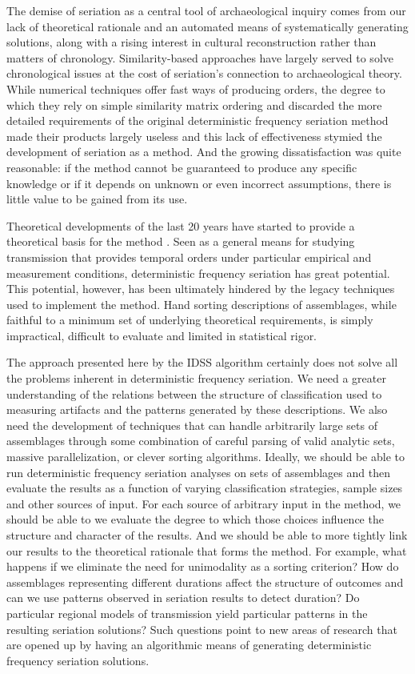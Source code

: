 \documentclass[10pt,letterpaper]{article}
\begin{document}
The demise of seriation as a central tool of archaeological inquiry comes from our lack of theoretical rationale and an automated means of systematically generating solutions, along with a rising interest in cultural reconstruction rather than matters of chronology. Similarity-based approaches have largely served to solve chronological issues at the cost of seriation’s connection to archaeological theory. While numerical techniques offer fast ways of producing orders, the degree to which they rely on simple similarity matrix ordering and discarded the more detailed requirements of the original deterministic frequency seriation method made their products largely useless and this lack of effectiveness stymied the development of seriation as a method. And the growing dissatisfaction was quite reasonable: if the method cannot be guaranteed to produce any specific knowledge or if it depends on unknown or even incorrect assumptions, there is little value to be gained from its use. 

Theoretical developments of the last 20 years have started to provide a theoretical basis for the method \cite{Dunnell1978,Lipo1997Population,Lipo2001,Lipo2001a,Lyman2001,Neiman1995,Teltser1995}. Seen as a general means for studying transmission that provides temporal orders under particular empirical and measurement conditions, deterministic frequency seriation has great potential. This potential, however, has been ultimately hindered by the legacy techniques used to implement the method. Hand sorting descriptions of assemblages, while faithful to a minimum set of underlying theoretical requirements, is simply impractical, difficult to evaluate and limited in statistical rigor. 

The approach presented here by the IDSS algorithm certainly does not solve all the problems inherent in deterministic frequency seriation. We need a greater understanding of the relations between the structure of classification used to measuring artifacts and the patterns generated by these descriptions. We also need the development of techniques that can handle arbitrarily large sets of assemblages through some combination of careful parsing of valid analytic sets, massive parallelization, or clever sorting algorithms. Ideally, we should be able to run deterministic frequency seriation analyses on sets of assemblages and then evaluate the results as a function of varying classification strategies, sample sizes and other sources of input. For each source of arbitrary input in the method, we should be able to we evaluate the degree to which those choices influence the structure and character of the results. And we should be able to more tightly link our results to the theoretical rationale that forms the method. For example, what happens if we eliminate the need for unimodality as a sorting criterion? How do assemblages representing different durations affect the structure of outcomes and can we use patterns observed in seriation results to detect duration?  Do particular regional models of transmission yield particular patterns in the resulting seriation solutions?   Such questions point to new areas of research that are opened up by having an algorithmic means of generating deterministic frequency seriation solutions.
\end{document}
